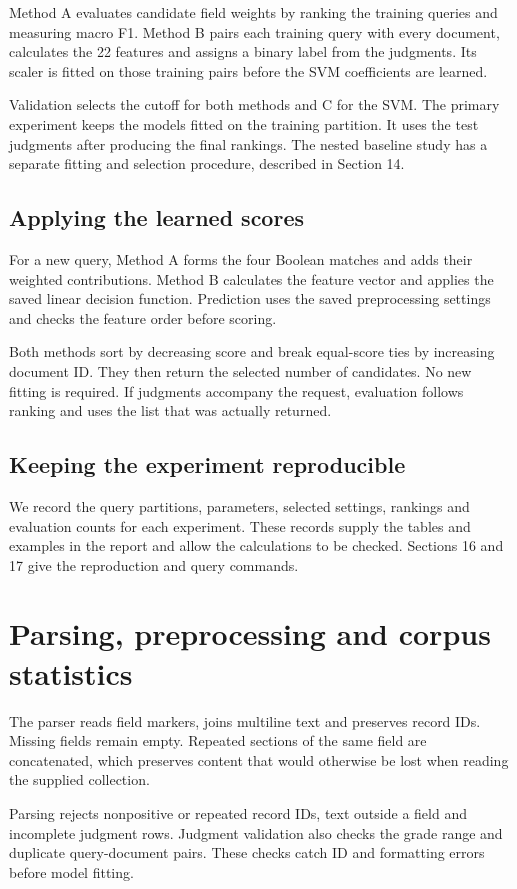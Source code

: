 \documentclass[12pt,a4paper]{article}
\begin{document}
Method A evaluates candidate field weights by ranking the training queries and measuring macro F1. Method B pairs each training query with every document, calculates the 22 features and assigns a binary label from the judgments. Its scaler is fitted on those training pairs before the SVM coefficients are learned.

Validation selects the cutoff for both methods and C for the SVM. The primary experiment keeps the models fitted on the training partition. It uses the test judgments after producing the final rankings. The nested baseline study has a separate fitting and selection procedure, described in Section 14.

\subsection{Applying the learned scores}
For a new query, Method A forms the four Boolean matches and adds their weighted contributions. Method B calculates the feature vector and applies the saved linear decision function. Prediction uses the saved preprocessing settings and checks the feature order before scoring.

Both methods sort by decreasing score and break equal-score ties by increasing document ID. They then return the selected number of candidates. No new fitting is required. If judgments accompany the request, evaluation follows ranking and uses the list that was actually returned.

\subsection{Keeping the experiment reproducible}
We record the query partitions, parameters, selected settings, rankings and evaluation counts for each experiment. These records supply the tables and examples in the report and allow the calculations to be checked. Sections 16 and 17 give the reproduction and query commands.

\section{Parsing, preprocessing and corpus statistics}
The parser reads field markers, joins multiline text and preserves record IDs. Missing fields remain empty. Repeated sections of the same field are concatenated, which preserves content that would otherwise be lost when reading the supplied collection.

Parsing rejects nonpositive or repeated record IDs, text outside a field and incomplete judgment rows. Judgment validation also checks the grade range and duplicate query-document pairs. These checks catch ID and formatting errors before model fitting.
\end{document}

